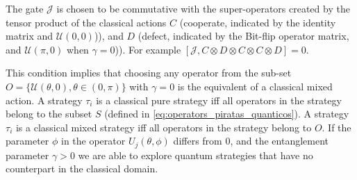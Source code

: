 The gate $\mathcal{J}$ is chosen to be commutative with the super-operators created by the tensor product of the classical actions $C$ (cooperate, indicated by the identity matrix and $\mathcal{U}(0,0)$)), and $D$ (defect, indicated by the Bit-flip operator matrix, and $\mathcal{U}(\pi,0)$ when $\gamma = 0$)). For example $[ \mathcal{J} , C \otimes D \otimes C \otimes C \otimes D ] = 0 $.


This condition implies that choosing any operator from the sub-set $O = \{ \mathcal{U} ( \theta , 0) , \theta \in (0, \pi) \}$ with $\gamma = 0$ is the equivalent of a classical mixed action. A strategy $\tau_{i}$ is a classical pure strategy iff all operators in the strategy belong to the subset $S$ (defined in \ref{eq:operators_piratas_quanticos}). A strategy $\tau_{i}$ is a classical mixed strategy iff all operators in the strategy belong to $O$.
If the parameter $\phi$ in the operator $U_{j}(\theta ,\phi)$ differs from $0$, and the entanglement parameter $\gamma > 0$ we are able to explore quantum strategies that have no counterpart in the classical domain\cite{Eisert2008}.










